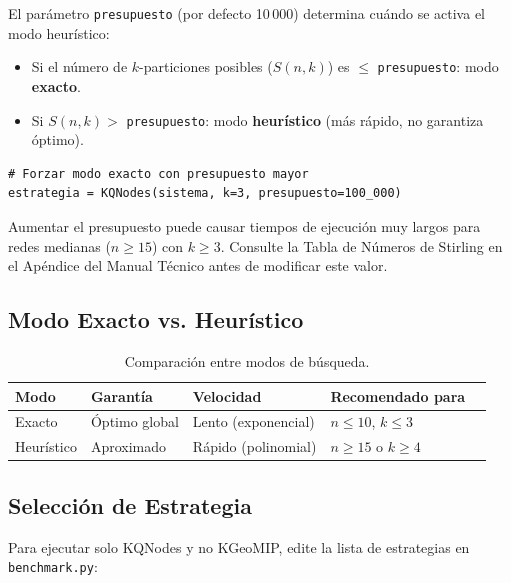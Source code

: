 El parámetro \texttt{presupuesto} (por defecto 10\,000) determina cuándo se activa el modo heurístico:

\begin{itemize}[itemsep=4pt]
    \item Si el número de $k$-particiones posibles ($S(n,k)$) es $\leq$ \texttt{presupuesto}: modo \textbf{exacto}.
    \item Si $S(n,k) >$ \texttt{presupuesto}: modo \textbf{heurístico} (más rápido, no garantiza óptimo).
\end{itemize}

\begin{lstlisting}[style=python, caption={Cambiar el presupuesto para forzar modo exacto.}]
# Forzar modo exacto con presupuesto mayor
estrategia = KQNodes(sistema, k=3, presupuesto=100_000)
\end{lstlisting}

\begin{aviso}
Aumentar el presupuesto puede causar tiempos de ejecución muy largos para redes medianas ($n \geq 15$) con $k \geq 3$. Consulte la Tabla de Números de Stirling en el Apéndice del Manual Técnico antes de modificar este valor.
\end{aviso}

\subsection{Modo Exacto vs. Heurístico}

\begin{table}[H]
    \centering
    \caption{Comparación entre modos de búsqueda.}
    \begin{tabular}{lllll}
        \toprule
        \textbf{Modo} & \textbf{Garantía} & \textbf{Velocidad} & \textbf{Recomendado para} \\
        \midrule
        Exacto      & Óptimo global & Lento (exponencial)   & $n \leq 10$, $k \leq 3$ \\
        Heurístico  & Aproximado    & Rápido (polinomial)   & $n \geq 15$ o $k \geq 4$ \\
        \bottomrule
    \end{tabular}
\end{table}

\subsection{Selección de Estrategia}

Para ejecutar solo KQNodes y no KGeoMIP, edite la lista de estrategias en \lstinline|benchmark.py|:

